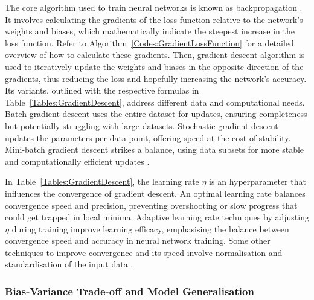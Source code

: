 

The core algorithm used to train neural networks is known as backpropagation \cite{rumelhart_learning_1986}. It involves calculating the gradients of the loss function relative to the network's weights and biases, which mathematically indicate the steepest increase in the loss function. Refer to Algorithm~\ref{Codes:GradientLossFunction} for a detailed overview of how to calculate these gradients. Then, gradient descent algorithm is used to iteratively update the weights and biases in the opposite direction of the gradients, thus reducing the loss and hopefully increasing the network's accuracy. Its variants, outlined with the respective formulas in Table~\ref{Tables:GradientDescent}, address different data and computational needs. Batch gradient descent uses the entire dataset for updates, ensuring completeness but potentially struggling with large datasets. Stochastic gradient descent updates the parameters per data point, offering speed at the cost of stability. Mini-batch gradient descent strikes a balance, using data subsets for more stable and computationally efficient updates \cite{goodfellow_deep_2016}.



In Table~\ref{Tables:GradientDescent}, the learning rate \( \eta \) is an hyperparameter that influences the convergence of gradient descent. An optimal learning rate balances convergence speed and precision, preventing overshooting or slow progress that could get trapped in local minima. Adaptive learning rate techniques by adjusting \( \eta \) during training improve learning efficacy, emphasising the balance between convergence speed and accuracy in neural network training. Some other techniques to improve convergence and its speed involve normalisation and standardisation of the input data \cite{goodfellow_deep_2016}.



\subsubsection{Bias-Variance Trade-off and Model Generalisation}

